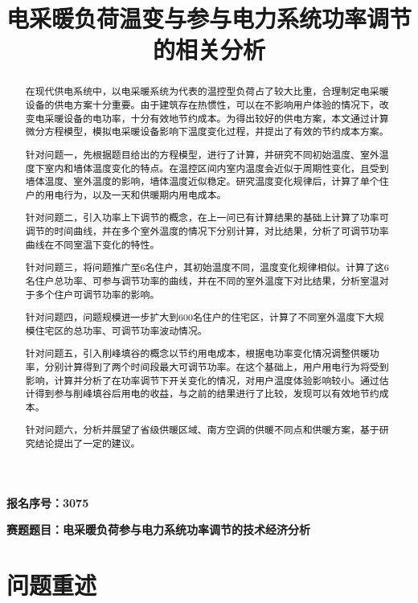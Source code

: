 \documentclass[withoutpreface,bwprint]{cumcmthesis} %
\title{电采暖负荷温变与参与电力系统功率调节的相关分析}
\begin{document}
\vspace*{15em}
\textbf{报名序号：3075}

\vspace*{15em}
\textbf{赛题题目：电采暖负荷参与电力系统功率调节的技术经济分析}
 \newpage
 \maketitle
 \begin{abstract}
在现代供电系统中，以电采暖系统为代表的温控型负荷占了较大比重，合理制定电采暖设备的供电方案十分重要。由于建筑存在热惯性，可以在不影响用户体验的情况下，改变电采暖设备的电功率，十分有效地节约成本。为得出较好的供电方案，本文通过计算微分方程模型，模拟电采暖设备影响下温度变化过程，并提出了有效的节约成本方案。

针对问题一，先根据题目给出的方程模型，进行了计算，并研究不同初始温度、室外温度下室内和墙体温度变化的特点。在温控区间内室内温度会近似于周期性变化，且受到墙体温度、室外温度的影响，墙体温度近似稳定。研究温度变化规律后，计算了单个住户的用电行为，以及一天和供暖期内用电成本。

针对问题二，引入功率上下调节的概念，在上一问已有计算结果的基础上计算了功率可调节的时间曲线，并在多个室外温度的情况下分别计算，对比结果，分析了可调节功率曲线在不同室温下变化的特性。

针对问题三，将问题推广至6名住户，其初始温度不同，温度变化规律相似。计算了这6名住户总功率、可参与调节功率的曲线，并在不同的室外温度下对比结果，分析室温对于多个住户可调节功率的影响。

针对问题四，问题规模进一步扩大到600名住户的住宅区，计算了不同室外温度下大规模住宅区的总功率、可调节功率波动情况。

针对问题五，引入削峰填谷的概念以节约用电成本，根据电功率变化情况调整供暖功率，分别计算得到了两个时间段最大可调节功率。在这个基础上，用户用电行为将受到影响，计算并分析了在功率调节下开关变化的情况，对用户温度体验影响较小。通过估计得到参与削峰填谷后用电的收益，与之前的结果进行了比较，发现可以有效地节约成本。

针对问题六，分析并展望了省级供暖区域、南方空调的供暖不同点和供暖方案，基于研究结论提出了一定的建议。
\end{abstract}

\tableofcontents

\newpage
\section{问题重述}
\end{document}
